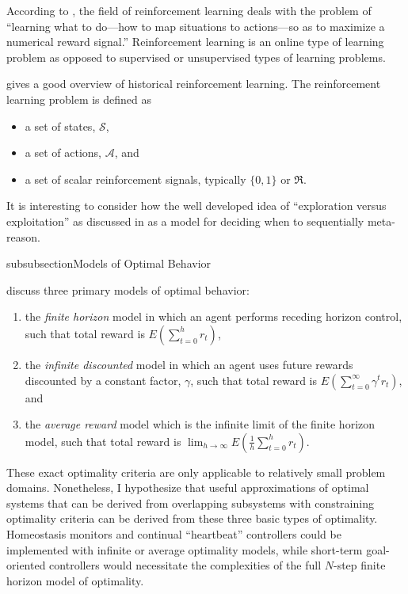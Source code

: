 According to \cite{sutton:1998}, the field of reinforcement learning deals with the problem of ``learning what to do---how to map situations to actions---so as to maximize a numerical reward signal.''
Reinforcement learning is an online type of learning problem as opposed to supervised or unsupervised types of learning problems.

\cite{kaelbling:1996} gives a good overview of historical reinforcement learning.
The reinforcement learning problem is defined as

\begin{itemize}
\item{a set of states, $\mathcal{S}$,}
\item{a set of actions, $\mathcal{A}$, and}
\item{a set of scalar reinforcement signals, typically $\{0,1\}$ or $\Re$.}
\end{itemize}

It is interesting to consider how the well developed idea of ``exploration versus exploitation'' as discussed in \cite{kaelbling:1996} as a model for deciding when to sequentially meta-reason.

subsubsection{Models of Optimal Behavior}

\cite{kaelbling:1996} discuss three primary models of optimal behavior:

\begin{enumerate}
\item{the \emph{finite horizon} model in which an agent performs receding horizon control, such that total reward is $E(\sum_{t=0}^{h}{r_t})$,}
\item{the \emph{infinite discounted} model in which an agent uses future rewards discounted by a constant factor, $\gamma$, such that total reward is $E(\sum_{t=0}^{\infty}{\gamma^t r_t})$, and}
\item{the \emph{average reward} model which is the infinite limit of the finite horizon model, such that total reward is $\lim_{h{\rightarrow}\infty}{E(\frac{1}{h}\sum_{t=0}^{h}{r_t})}$.}
\end{enumerate}

These exact optimality criteria are only applicable to relatively small problem domains.
Nonetheless, I hypothesize that useful approximations of optimal systems that can be derived from overlapping subsystems with constraining optimality criteria can be derived from these three basic types of optimality.
Homeostasis monitors and continual ``heartbeat'' controllers could be implemented with infinite or average optimality models, while short-term goal-oriented controllers would necessitate the complexities of the full $N$-step finite horizon model of optimality.

